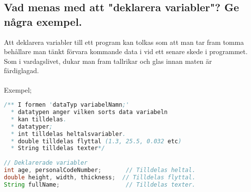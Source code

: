 \documentclass[../main.tex]{subfiles}
\begin{document}
\subsection{Vad menas med att "deklarera variabler"? Ge några exempel.}
Att deklarera variabler till ett program kan tolkas som att man tar fram tomma behållare man tänkt förvara kommande data i vid ett senare skede i programmet. Som i vardagslivet, dukar man fram tallrikar och glas innan maten är färdiglagad.\\
\\
Exempel;
\begin{lstlisting}[language=java]
/** I formen 'dataTyp variabelNamn;'
  * datatypen anger vilken sorts data variabeln
  * kan tilldelas.
  * datatyper;
  * int tilldelas heltalsvariabler.
  * double tilldelas flyttal (1.3, 25.5, 0.032 etc)
  * String tilldelas texter*/
  
// Deklarerade variabler  
int age, personalCodeNumber;       // Tilldelas heltal.
double height, width, thickness;  // Tilldelas flyttal.
String fullName;                   // Tilldelas texter.
\end{lstlisting}
\end{document}
